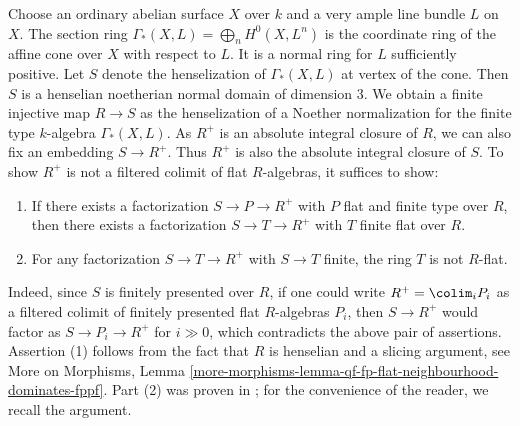 \medskip\noindent
Choose an ordinary abelian surface $X$ over $k$ and a very ample line bundle
$L$ on $X$. The section ring $\Gamma_*(X, L) = \bigoplus_n H^0(X,L^n)$ is
the coordinate ring of the affine cone over $X$ with respect to $L$. It is
a normal ring for $L$ sufficiently positive. Let $S$ denote the henselization
of $\Gamma_*(X, L)$ at vertex of the cone. Then $S$ is a henselian noetherian
normal domain of dimension $3$. We obtain a finite injective
map $R \to S$ as the henselization of a Noether normalization
for the finite type $k$-algebra $\Gamma_*(X, L)$. As $R^+$ is an
absolute integral closure of $R$, we can also fix an embedding $S \to R^+$.
Thus $R^+$ is also the absolute integral closure of $S$. To show $R^+$
is not a filtered colimit of flat $R$-algebras, it suffices to show:
\begin{enumerate}
\item If there exists a factorization $S \to P \to R^+$ with $P$ flat
and finite type over $R$, then there exists a factorization
$S \to T \to R^+$ with $T$ finite flat over $R$.
\item For any factorization $S \to T \to R^+$ with $S \to T$ finite,
the ring $T$ is not $R$-flat.
\end{enumerate}
Indeed, since $S$ is finitely presented over $R$, if one could write
$R^+ = \colim_i P_i$ as a filtered colimit of finitely presented flat
$R$-algebras $P_i$, then $S \to R^+$ would factor as $S \to P_i \to R^+$
for $i \gg 0$, which contradicts the above pair of assertions.
Assertion (1) follows from the fact that $R$ is henselian and a
slicing argument, see More on Morphisms, Lemma
\ref{more-morphisms-lemma-qf-fp-flat-neighbourhood-dominates-fppf}.
Part (2) was proven in \cite{BhattSmallCMMod}; for the convenience of
the reader, we recall the argument.

